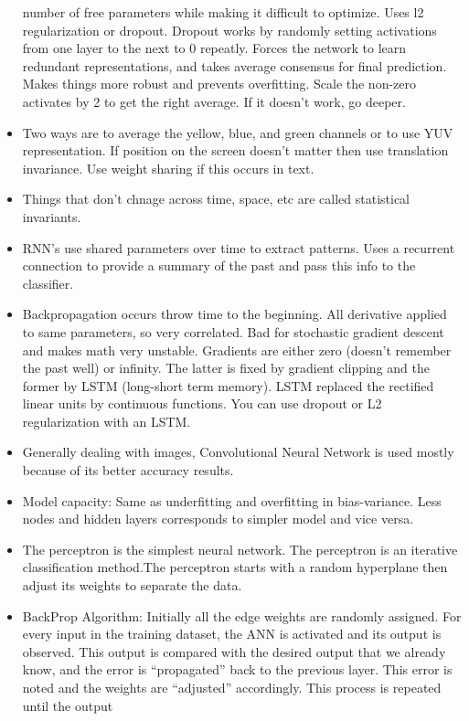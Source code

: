 \documentclass[]{book}
\theoremstyle{definition}
\theoremstyle{definition}
\theoremstyle{definition}
\theoremstyle{remark}
\begin{document}
\begin{itemize}
  number of free parameters while making it difficult to optimize. Uses
  l2 regularization or dropout. Dropout works by randomly setting
  activations from one layer to the next to 0 repeatly. Forces the
  network to learn redundant representations, and takes average
  consensus for final prediction. Makes things more robust and prevents
  overfitting. Scale the non-zero activates by 2 to get the right
  average. If it doesn't work, go deeper.
\item
  Two ways are to average the yellow, blue, and green channels or to use
  YUV representation. If position on the screen doesn't matter then use
  translation invariance. Use weight sharing if this occurs in text.
\item
  Things that don't chnage across time, space, etc are called
  statistical invariants.
\item
  RNN's use shared parameters over time to extract patterns. Uses a
  recurrent connection to provide a summary of the past and pass this
  info to the classifier.
\item
  Backpropagation occurs throw time to the beginning. All derivative
  applied to same parameters, so very correlated. Bad for stochastic
  gradient descent and makes math very unstable. Gradients are either
  zero (doesn't remember the past well) or infinity. The latter is fixed
  by gradient clipping and the former by LSTM (long-short term memory).
  LSTM replaced the rectified linear units by continuous functions. You
  can use dropout or L2 regularization with an LSTM.
\item
  Generally dealing with images, Convolutional Neural Network is used
  mostly because of its better accuracy results.
\item
  Model capacity: Same as underfitting and overfitting in bias-variance.
  Less nodes and hidden layers corresponds to simpler model and vice
  versa.
\item
  The perceptron is the simplest neural network. The perceptron is an
  iterative classification method.The perceptron starts with a random
  hyperplane then adjust its weights to separate the data.
\item
  BackProp Algorithm: Initially all the edge weights are randomly
  assigned. For every input in the training dataset, the ANN is
  activated and its output is observed. This output is compared with the
  desired output that we already know, and the error is ``propagated''
  back to the previous layer. This error is noted and the weights are
  ``adjusted'' accordingly. This process is repeated until the output

\end{itemize}
\end{document}
